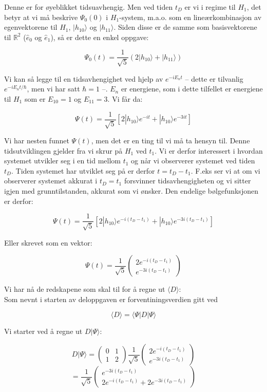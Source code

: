 \documentclass[a4paper,norsk, 10pt]{article}
\numberwithin{equation}{section}
\begin{document}
Denne er for øyeblikket tidsuavhengig. Men ved tiden $t_D$ er vi i regime til $H_1$, det betyr at vi må beskrive $\Psi_0(0)$ i $H_1$-system, m.a.o. som en lineærkombinasjon av egenvektorene til $H_1$, $|h_{10}\rangle$ og $|h_{11}\rangle$. Siden disse er de samme som basisvektorene til $\mathbb{R}^2$ ($\hat{e}_0$ og $\hat{e}_1$), så er dette en enkel oppgave:

$$
\Psi_0(t) = \frac{1}{\sqrt{5}}(2|h_{10}\rangle + |h_{11}\rangle)
$$

Vi kan så legge til en tidsavhengighet ved hjelp av $e^{-iE_nt}$ -- dette er tilvanlig $e^{-iE_nt/\hbar}$, men vi har satt $\hbar = 1$ --. $E_n$ er energiene, som i dette tilfellet er energiene til $H_1$ som er $E_{10} = 1$ og $E_{11} = 3$. Vi får da:

$$
\Psi(t) = \frac{1}{\sqrt{5}}\left[2|h_{10}\rangle e^{-it} + |h_{10}\rangle e^{-3it}\right]
$$

Vi har nesten funnet $\Psi(t)$, men det er en ting til vi må ta hensyn til. Denne tidsutviklingen gjelder fra vi skrur på $H_1$ ved $t_1$. Vi er derfor interessert i hvordan systemet utvikler seg i en tid mellom $t_1$ og når vi observerer systemet ved tiden $t_D$. Tiden systemet har utviklet seg på er derfor $t = t_D - t_1$. F.eks ser vi at om vi observerer systemet akkurat i $t_D = t_1$ forsvinner tidsavhengigheten og vi sitter igjen med grunntilstanden, akkurat som vi ønsker. Den endelige bølgefunksjonen er derfor:

\begin{equation}
\Psi(t) = \frac{1}{\sqrt{5}}\left[2|h_{10}\rangle e^{-i(t_D - t_1)} + |h_{10}\rangle e^{-3i(t_D - t_1)}\right]
\label{eq:Psi(t)}
\end{equation}

Eller skrevet som en vektor:

$$
\Psi(t) = \frac{1}{\sqrt{5}}
\begin{pmatrix}
2e^{-i(t_D - t_1)}\\
e^{-3i(t_D - t_1)}
\end{pmatrix}
$$

Vi har nå de redskapene som skal til for å regne ut $\langle D \rangle$:\\

Som nevnt i starten av deloppgaven er forventiningsverdien gitt ved

$$
\langle D\rangle = \langle\Psi | D | \Psi \rangle
$$

Vi starter ved å regne ut $D|\Psi\rangle$:

$$
D|\Psi\rangle =
\begin{pmatrix}
0 &1\\1&2
\end{pmatrix}
\frac{1}{\sqrt{5}}
\begin{pmatrix}
2e^{-i(t_D - t_1)}\\
e^{-3i(t_D - t_1)}
\end{pmatrix}
$$
$$
= \frac{1}{\sqrt{5}}
\begin{pmatrix}
e^{-3i(t_D-t_1)}\\
2e^{-i(t_D-t_1)} + 2e^{-3i(t_D-t_1)}
\end{pmatrix}
$$
\end{document}

